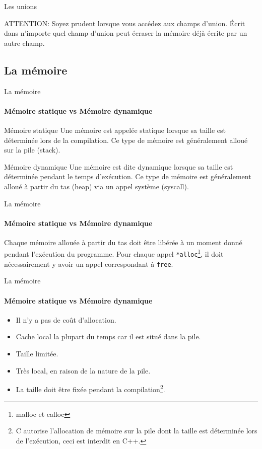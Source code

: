 \documentclass{beamer}
\begin{document}
\begin{darkframes}
	\begin{frame}{Les unions}
		\begin{alertblock}{ATTENTION: Soyez prudent lorsque vous accédez aux champs d'union. Écrit dans n'importe quel champ d'union peut écraser la mémoire déjà écrite par un autre champ.}
		\unionExmpDanger
		\end{alertblock}
	\end{frame}
  	
  	\subsection{La mémoire}
  	\begin{frame}{La mémoire}
  		\framesubtitle{Mémoire statique vs Mémoire dynamique}
  		\begin{block}{Mémoire statique}
  			Une mémoire est appelée \alert{statique } lorsque sa taille est déterminée lors de la \alert{compilation}. Ce type de mémoire est généralement alloué sur la \alert{pile} (stack).
  		\end{block}
  		\begin{block}{Mémoire dynamique}
  			Une mémoire est dite \alert{dynamique} lorsque sa taille est déterminée pendant le temps \alert{d'exécution}. Ce type de mémoire est généralement alloué à partir du \alert{tas} (heap) via un appel système (syscall).
  		\end{block}
  	\end{frame}
  
  	\begin{frame}{La mémoire}
  		\framesubtitle{Mémoire statique vs Mémoire dynamique}
  		\begin{alertblock}{
  			Chaque mémoire allouée à partir du tas doit être libérée à un moment donné pendant l'exécution du programme. Pour chaque appel \texttt{*alloc}\footnote[frame]{malloc et calloc}, il doit nécessairement y avoir un appel correspondant à \texttt{free}.}
  		\end{alertblock}
  	\end{frame}
  
  	\begin{frame}{La mémoire}
  		\framesubtitle{Mémoire statique vs Mémoire dynamique}
		\begin{itemize}
			\item Il n'y a pas de coût d'allocation.
			\item Cache local la plupart du temps car il est situé dans la pile.
			\item Taille limitée.
			\item Très local, en raison de la nature de la pile.
			\item La taille doit être fixée pendant la compilation\footnote[frame]{C autorise l'allocation de mémoire sur la pile dont la taille est déterminée lors de l'exécution, ceci est interdit en C++.}.
		\end{itemize}
  	\end{frame}
  

\end{darkframes}
\end{document}
